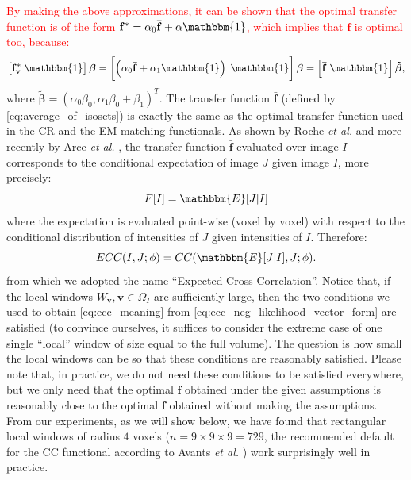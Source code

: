 \textcolor{red}{By making the above approximations, it can be shown that the optimal transfer function is of the form $\mathbf{f^{*}} = \alpha_{0} \mathbf{\bar{f}} + \alpha\mathbbm{1}$, which implies that $\mathbf{\bar{f}}$ is optimal too, because:
\begin{displaymath}
    \left[\mathbf{f^{*}_{v}} \; \mathbbm{1}\right]\boldsymbol{\beta} = 
    \left[\left(\alpha_{0} \mathbf{\bar{f}} + \alpha_{1}\mathbbm{1}\right) \; \mathbbm{1}\right]\boldsymbol{\beta} =
    \left[\mathbf{\bar{f}} \; \mathbbm{1}\right]\boldsymbol{\tilde{\beta}},
\end{displaymath}
}
where $\boldsymbol{\tilde{\beta}} = (\alpha_{0}\beta_{0}, \alpha_{1}\beta_{0} + \beta_{1})^{T}$. The transfer function $\mathbf{\bar{f}}$ (defined by \eqref{eq:average_of_isosets}) is exactly the same as the optimal transfer function used in the CR and the EM matching functionals. As shown by Roche {\it et al.} \cite{Roche1998, Roche2000} and more recently by Arce {\it et al.} \cite{Arce-santana2014}, the transfer function $\mathbf{\bar{f}}$ evaluated over image $I$ corresponds to the conditional expectation of image $J$ given image $I$, more precisely:
\begin{equation*}
    F[I] = \mathbbm{E}[J | I]
\end{equation*}
where the expectation is evaluated point-wise (voxel by voxel) with respect to the conditional distribution of intensities of $J$ given intensities of $I$. Therefore:
\begin{equation}\label{eq:ecc_meaning}
    ECC(I, J; \phi) = CC(\mathbbm{E}[J|I], J ; \phi).
\end{equation}
from which we adopted the name ``Expected Cross Correlation''. Notice that, if the local windows $W_{\mathbf{v}}, \mathbf{v}\in\Omega_{I}$ are sufficiently large, then the two conditions we used to obtain \eqref{eq:ecc_meaning} from \eqref{eq:ecc_neg_likelihood_vector_form} are satisfied (to convince ourselves, it suffices to consider the extreme case of one single ``local'' window of size equal to the full volume). The question is how small the local windows can be so that these conditions are reasonably satisfied. Please note that, in practice, we do not need these conditions to be satisfied everywhere, but we only need that the optimal $\mathbf{f}$ obtained under the given assumptions is reasonably close to the optimal $\mathbf{f}$ obtained without making the assumptions. From our experiments, as we will show below, we have found that rectangular local windows of radius $4$ voxels ($n=9\times 9\times 9 = 729$, the recommended default for the CC functional according to Avants {\it et al.} \cite{Avants2011}) work surprisingly well in practice.\\

